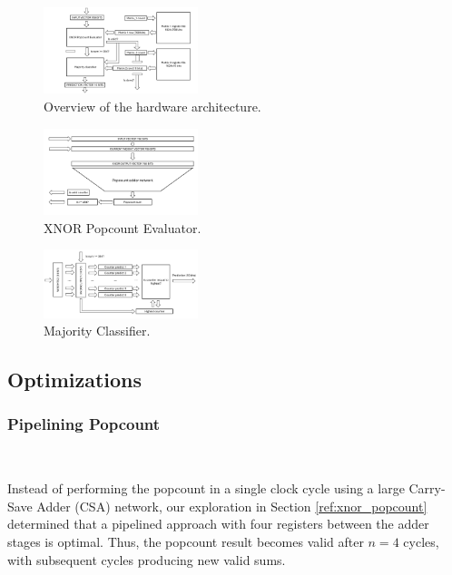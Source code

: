\documentclass[conference]{IEEEtran}
\begin{document}
\begin{figure}[h]
    \centering
    \includegraphics[width=0.4\textwidth]{overview.pdf}
    \caption{Overview of the hardware architecture.}
    \label{fig:overview}
\end{figure}

\begin{figure}[h]
    \centering
    \includegraphics[width=0.4\textwidth]{Xnor_popcount.pdf}
    \caption{XNOR Popcount Evaluator.}
    \label{fig:xnor_popcount}
\end{figure}

\begin{figure}[h]
    \centering
    \includegraphics[width=0.4\textwidth]{majority_classifier.pdf}
    \caption{Majority Classifier.}
    \label{fig:majority_classifier}
\end{figure}



\subsection{Optimizations}
\subsubsection{Pipelining Popcount}
\hfill\\
\label{ref:pipeline_popcount}

Instead of performing the popcount in a single clock cycle using a large Carry-Save Adder (CSA) network, our exploration in Section \ref{ref:xnor_popcount} determined that a pipelined approach with four registers between the adder stages is optimal. Thus, the popcount result becomes valid after $n=4$ cycles, with subsequent cycles producing new valid sums.
\end{document}
